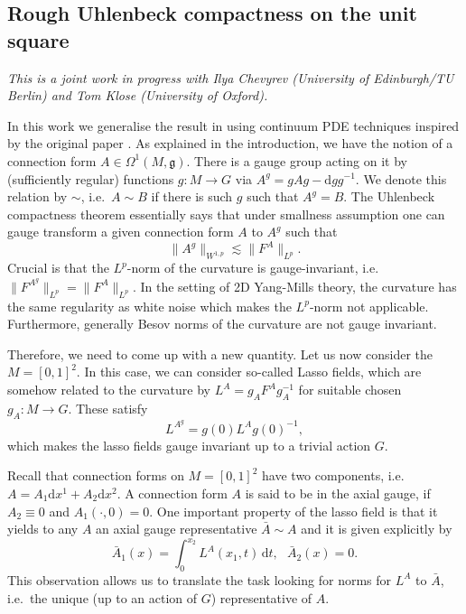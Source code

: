 \documentclass[11pt]{article}
\numberwithin{equation}{section}
\theoremstyle{definition}
\theoremstyle{remark}
\newcommand{\dif}{\,\mathrm{d}}
\newcommand{\diff}{\mathrm{d}}
\newcommand{\1}{\mathbf 1}
\newcommand{\<}{\langle}
\renewcommand{\>}{\rangle}
\begin{document}

\subsection{Rough Uhlenbeck compactness on the unit square}\label{sec:RUC_square}
\textit{This is a joint work in progress with Ilya Chevyrev (University of Edinburgh/TU Berlin) and Tom Klose (University of Oxford).}

\medskip

\noindent In this work we generalise the result in \cite{Chevyrev19} using continuum PDE techniques inspired by the original paper \cite{Uhlenbeck82}. As explained in the introduction, we have the notion of a connection form $A\in\Omega^1(M,\mathfrak g)$. There is a gauge group acting on it by (sufficiently regular) functions $g:M\to G$ via $A^g=gAg-\diff gg^{-1}$. We denote this relation by $\sim$, i.e.\ $A\sim B$ if there is such $g$ such that $A^g=B$.  The Uhlenbeck compactness theorem essentially says that under smallness assumption one can gauge transform a given connection form $A$ to $A^g$ such that 
\[
\|A^g\|_{W^{1,p}}\lesssim \|F^A\|_{L^p}.
\]
Crucial is that the $L^p$-norm of the curvature is gauge-invariant, i.e.\ $\|F^{A^g}\|_{L^p}=\|F^A\|_{L^p}$. In the setting of 2D Yang-Mills theory, the curvature has the same regularity as white noise which makes the $L^p$-norm not applicable. Furthermore, generally Besov norms of the curvature are not gauge invariant.

Therefore, we need to come up with a new quantity. Let us now consider the $M=[0,1]^2$. In this case, we can consider so-called Lasso fields, which are somehow related to the curvature by $L^A=g_AF^Ag_A^{-1}$ for suitable chosen $g_A:M\to G$. These satisfy 
\[
L^{A^g}=g(0)L^Ag(0)^{-1},
\]
which makes the lasso fields  gauge invariant up to a trivial action $G$. 

Recall that connection forms on $M=[0,1]^2$ have two components, i.e.\ $A=A_1\diff x^1+A_2\diff x^2$. A connection form $A$ is said to be in the axial gauge, if $A_2\equiv 0$ and $A_1(\cdot,0)=0$. One important property of the lasso field is that it yields to any $A$ an axial gauge representative $\bar A\sim A$ and it is given explicitly by 
\[
\bar A_1(x)=\int^{x_2}_0 L^A(x_1,t)\dif t, \ \ \  \bar A_2(x)=0. 
\]
This observation allows us to translate the task looking for norms for $L^A$ to $\bar A$, i.e.\ the unique (up to an action of $G$) representative of $A$. 
\end{document}
